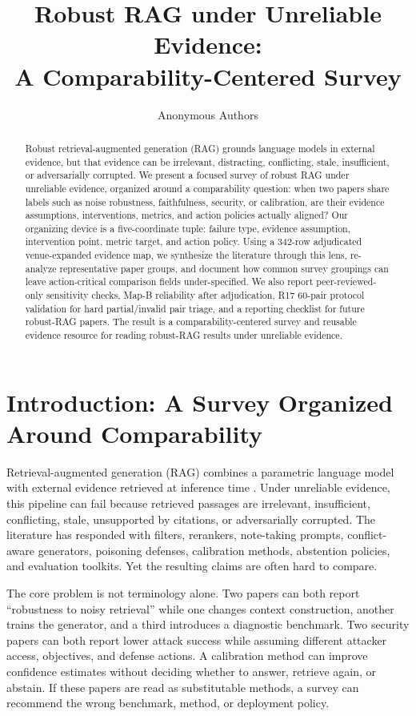 \documentclass[11pt]{article}
\title{Robust RAG under Unreliable Evidence:\\
A Comparability-Centered Survey}
\author{Anonymous Authors}
\date{}
\begin{document}
\maketitle

\begin{abstract}
Robust retrieval-augmented generation (RAG) grounds language models in external evidence, but that evidence can be irrelevant, distracting, conflicting, stale, insufficient, or adversarially corrupted. We present a focused survey of robust RAG under unreliable evidence, organized around a comparability question: when two papers share labels such as noise robustness, faithfulness, security, or calibration, are their evidence assumptions, interventions, metrics, and action policies actually aligned? Our organizing device is a five-coordinate tuple: failure type, evidence assumption, intervention point, metric target, and action policy. Using a 342-row adjudicated venue-expanded evidence map, we synthesize the literature through this lens, re-analyze representative paper groups, and document how common survey groupings can leave action-critical comparison fields under-specified. We also report peer-reviewed-only sensitivity checks, Map-B reliability after adjudication, R17 60-pair protocol validation for hard partial/invalid pair triage, and a reporting checklist for future robust-RAG papers. The result is a comparability-centered survey and reusable evidence resource for reading robust-RAG results under unreliable evidence.
\end{abstract}

\section{Introduction: A Survey Organized Around Comparability}

Retrieval-augmented generation (RAG) combines a parametric language model with external evidence retrieved at inference time \citep{lewis2020rag}. Under unreliable evidence, this pipeline can fail because retrieved passages are irrelevant, insufficient, conflicting, stale, unsupported by citations, or adversarially corrupted. The literature has responded with filters, rerankers, note-taking prompts, conflict-aware generators, poisoning defenses, calibration methods, abstention policies, and evaluation toolkits. Yet the resulting claims are often hard to compare.

The core problem is not terminology alone. Two papers can both report ``robustness to noisy retrieval'' while one changes context construction, another trains the generator, and a third introduces a diagnostic benchmark. Two security papers can both report lower attack success while assuming different attacker access, objectives, and defense actions. A calibration method can improve confidence estimates without deciding whether to answer, retrieve again, or abstain. If these papers are read as substitutable methods, a survey can recommend the wrong benchmark, method, or deployment policy.
\end{document}

